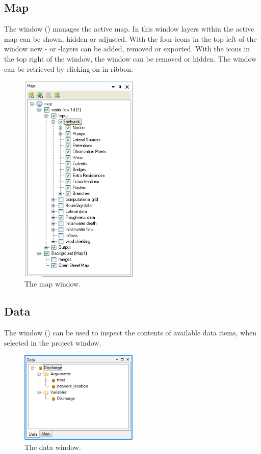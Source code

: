 \subsection{Map}
\label{subsec:Map}
The  window () manages the active map. In this window layers within the active map can be shown, hidden or adjusted.
%
With the four icons in the top left of the window new - or -layers can be added, removed or exported. With the icons in the top right of the window, the window can be removed or hidden. The window can be retrieved by clicking on  in  ribbon.
%
\begin{figure} [H]
	\centering
		\includegraphics[width=0.5\textwidth]{Figures/Chapter_overview/view_map_window.png}
	\caption{The map window.}
	\label{fig:fig2.4}
\end{figure}

\subsection{Data}
\label{subsec:data}
The  window () can be used to inspect the contents of available data items, when selected in the project window.
%
\begin{figure} [H]
	\centering
		\includegraphics[width=0.5\textwidth]{Figures/Chapter_overview/view_data_window.png}
	\caption{The data window.}
	\label{fig:datawindow}
\end{figure}

